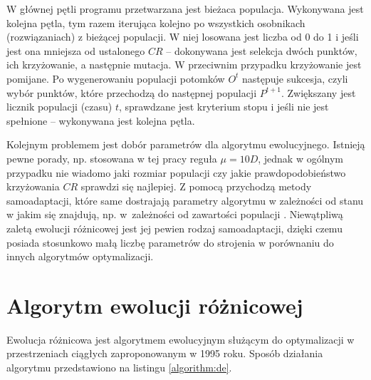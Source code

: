 \documentclass[a4paper,onecolumn,oneside,12pt,wide,floatssmall]{mwrep}
\theoremstyle{definition}
\theoremstyle{plain}%
\theoremstyle{remark}
\begin{document}
W głównej pętli programu przetwarzana jest bieżaca populacja. 
Wykonywana jest kolejna pętla, tym razem iterująca kolejno po wszystkich osobnikach 
(rozwiązaniach) z bieżącej populacji. W niej losowana jest liczba od 0 do 1 i jeśli jest ona mniejsza
od ustalonego $CR$ -- dokonywana jest selekcja dwóch punktów, ich krzyżowanie, a następnie mutacja.
W przeciwnim przypadku krzyżowanie jest pomijane.
Po wygenerowaniu populacji potomków $O^t$ następuje sukcesja, czyli wybór punktów, które przechodzą
do następnej populacji $P^{t+1}$. Zwiększany jest licznik populacji (czasu) $t$,
sprawdzane jest kryterium stopu i jeśli nie jest spełnione --
wykonywana jest kolejna pętla.
 
Kolejnym problemem jest dobór parametrów dla algorytmu ewolucyjnego. 
Istnieją pewne porady, np. stosowana w tej pracy reguła $\mu = 10D$, 
jednak w ogólnym przypadku nie wiadomo jaki rozmiar populacji czy jakie prawdopodobieństwo
krzyżowania $CR$ sprawdzi się najlepiej. Z pomocą przychodzą
metody samoadaptacji, które same dostrajają parametry algorytmu w zależności od stanu w jakim się
znajdują, np. w~zależności od zawartości populacji \cite{brest}.
Niewątpliwą zaletą ewolucji różnicowej jest jej pewien rodzaj samoadaptacji, dzięki
czemu posiada stosunkowo małą liczbę parametrów do strojenia w porównaniu do innych algorytmów
optymalizacji.

\section{Algorytm ewolucji różnicowej}

Ewolucja różnicowa jest algorytmem ewolucyjnym służącym do optymalizacji
w przestrzeniach ciągłych zaproponowanym w 1995 roku. \cite{storn} Sposób działania algorytmu
przedstawiono na listingu \ref{algorithm:de}.

\usetikzlibrary{decorations.pathreplacing,calc}
\newcommand{\tikzmark}[1]{\tikz[overlay,remember picture] \node (#1) {};}

\newcommand*{\AddNote}[4]{%
    \begin{tikzpicture}[overlay, remember picture]
        \draw [decoration={brace,amplitude=0.5em},decorate,thick]
            ($(#3)!(#1.north)!($(#3)-(0,1)$)$) --  
            ($(#3)!(#2.south)!($(#3)-(0,1)$)$)
                node [align=center, text width=2.5cm, pos=0.5, anchor=west] {#4};
    \end{tikzpicture}
}%
\end{document}
